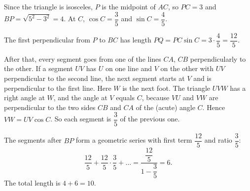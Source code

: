 Since the triangle is isosceles, $P$ is the midpoint of $AC$, so $PC=3$ and $BP=\sqrt{5^2-3^2}=4$. At $C$, $\cos C=\dfrac{3}{5}$ and $\sin C=\dfrac{4}{5}$.

The first perpendicular from $P$ to $BC$ has length $PQ=PC\sin C=3\cdot\dfrac{4}{5}=\dfrac{12}{5}$.

After that, every segment goes from one of the lines $CA$, $CB$ perpendicularly to the other. If a segment $UV$ has $U$ on one line and $V$ on the other with $UV$ perpendicular to the second line, the next segment starts at $V$ and is perpendicular to the first line. Here $W$ is the next foot. The triangle $UVW$ has a right angle at $W$, and the angle at $V$ equals $C$, because $VU$ and $VW$ are perpendicular to the two sides $CB$ and $CA$ of the (acute) angle $C$. Hence $VW=UV\cos C$. So each segment is $\dfrac{3}{5}$ of the previous one.


The segments after $BP$ form a geometric series with first term $\dfrac{12}{5}$ and ratio $\dfrac{3}{5}$:
\[
\dfrac{12}{5}+\dfrac{12}{5}\cdot\dfrac{3}{5}+\dots=\dfrac{\dfrac{12}{5}}{1-\dfrac{3}{5}}=6 .
\]
The total length is $4+6=\boxed{10}$.

